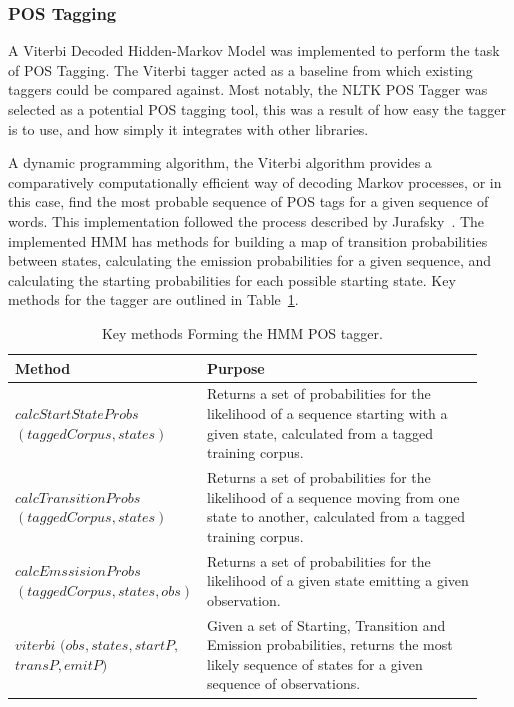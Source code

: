 \documentclass[10pt]{report}
\begin{document}
\subsubsection{POS Tagging}
A Viterbi Decoded Hidden-Markov Model was implemented to perform the task of POS Tagging. The Viterbi tagger acted as a baseline from which existing taggers could be compared against. Most notably, the NLTK POS Tagger was selected as a potential POS tagging tool, this was a result of how easy the tagger is to use, and how simply it integrates with other libraries.

A dynamic programming algorithm, the Viterbi algorithm provides a comparatively computationally efficient way of decoding Markov processes, or in this case, find the most probable sequence of POS tags for a given sequence of words. This implementation followed the process described by Jurafsky~\cite{Jurafsky2014-yb}. The implemented HMM has methods for building a map of transition probabilities between states, calculating the emission probabilities for a given sequence, and calculating the starting probabilities for each possible starting state. Key methods for the tagger are outlined in Table~\ref{tab:pos_tagging_methods}.


\renewcommand{\baselinestretch}{1.0}\normalsize
\renewcommand{\arraystretch}{2.0}
\begin{table}[h!]
  \begin{tabular}{>{\raggedright}p{0.3\linewidth} | p{0.63\linewidth}}
    Method & Purpose\\
    \hline
    $calcStartStateProbs$ $(taggedCorpus, states)$& Returns a set of probabilities for the likelihood of a sequence starting with a given state, calculated from a tagged training corpus. \\
    $calcTransitionProbs$ $(taggedCorpus, states)$ & Returns a set of probabilities for the likelihood of a sequence moving from one state to another, calculated from a tagged training corpus. \\
    $calcEmssisionProbs$ $(taggedCorpus, states, obs)$ & Returns a set of probabilities for the likelihood of a given state emitting a given observation.\\
    $viterbi$ $(obs, states, startP,$ $transP, emitP)$ & Given a set of Starting, Transition and Emission probabilities, returns the most likely sequence of states for a given sequence of observations. 
  \end{tabular}
  \caption{Key methods Forming the HMM POS tagger.\label{tab:pos_tagging_methods}}
\end{table}
\renewcommand{\baselinestretch}{2.0}\normalsize
\renewcommand{\arraystretch}{1.0}
\end{document}
